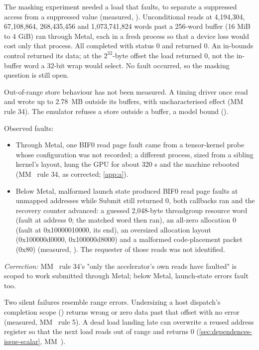 The masking experiment needed a load that faults, to separate a suppressed access from a suppressed value (measured,
 ). Unconditional  reads at
4,194,304, 67,108,864, 268,435,456 and 1,073,741,824 words past a 256-word buffer (16 MiB to 4 GiB) ran through Metal,
each in a fresh process so that a device loss would cost only that process. All completed with status 0 and returned 0.
An in-bounds control returned its data; at the $2^{32}$-byte offset the load returned 0, not the in-buffer word a 32-bit
wrap would select. No fault occurred, so the masking question is still open.

Out-of-range store behaviour has not been measured. A timing driver once read and wrote up to 2.78~MB
outside its buffers, with uncharacterised effect (MM~ rule 34). The emulator refuses a store outside a buffer, a model
bound ().

Observed faults:

\begin{itemize}
\item Through Metal, one BIF0 read page fault came from a  tensor-kernel probe whose configuration was not
  recorded; a different process, sized from a sibling kernel's layout, hung the GPU for about 320 s and the machine
  rebooted (MM~ rule 34, as corrected; \cref{app:a}).
\item Below Metal, malformed launch state produced BIF0 read page faults at unmapped addresses while Submit still returned
  0, both callbacks ran and the recovery counter advanced: a guessed 2,048-byte threadgroup resource word (fault at
  address 0; the matched word then ran), an all-zero allocation 0 (fault at 0x10000010000, its end), an oversized
  allocation layout (0x100000d0000, 0x100000d8000) and a malformed code-placement packet (0x80) (measured,
  ). The requester of those reads was not identified.
\end{itemize}

\emph{Correction:} MM~ rule 34's "only the accelerator's own reads have faulted" is scoped to work submitted through
Metal; below Metal, launch-state errors fault too.

Two silent failures resemble range errors. Undersizing a host dispatch's completion scope ()
returns wrong or zero data past that offset with no error (measured, MM~ rule 5). A dead load landing late can
overwrite a reused address register so that the next load reads out of range and returns 0 (\cref{sec:dependences-issue-scalar}, MM~).


